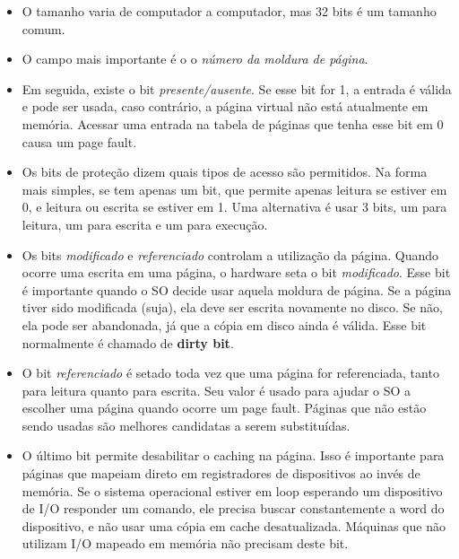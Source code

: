 \documentclass[10pt]{article}
\begin{document}
\begin{itemize}
    \item O tamanho varia de computador a computador, mas 32 bits é um tamanho comum.
    \item O campo mais importante é o o \textit{número da moldura de página}.
    \item Em seguida, existe o bit \textit{presente/ausente}. Se esse bit for
        1, a entrada é válida e pode ser usada, caso contrário, a página virtual
        não está atualmente em memória. Acessar uma entrada na tabela de páginas
        que tenha esse bit em 0 causa um page fault.
    \item Os bits de proteção dizem quais tipos de acesso são permitidos. Na forma
        mais simples, se tem apenas um bit, que permite apenas leitura se estiver em
        0, e leitura ou escrita se estiver em 1. Uma alternativa é usar 3 bits,
        um para leitura, um para escrita e um para execução.
    \item Os bits \textit{modificado} e \textit{referenciado} controlam a utilização
        da página. Quando ocorre uma escrita em uma página, o hardware seta o bit
        \textit{modificado}. Esse bit é importante quando o SO decide usar aquela
        moldura de página. Se a página tiver sido modificada (suja), ela deve ser
        escrita novamente no disco. Se não, ela pode ser abandonada, já que a cópia
        em disco ainda é válida. Esse bit normalmente é chamado de \textbf{dirty bit}.
    \item O bit \textit{referenciado} é setado toda vez que uma página for referenciada,
        tanto para leitura quanto para escrita. Seu valor é usado para ajudar o SO a 
        escolher uma página quando ocorre um page fault. Páginas que não estão sendo
        usadas são melhores candidatas a serem substituídas.
    \item O último bit permite desabilitar o caching na página. Isso é importante para
        páginas que mapeiam direto em registradores de dispositivos ao invés de memória. 
        Se o sistema operacional estiver em loop esperando um dispositivo de I/O responder
        um comando, ele precisa buscar constantemente a word do dispositivo, e não usar
        uma cópia em cache desatualizada. Máquinas que não utilizam I/O mapeado em 
        memória não precisam deste bit.
\end{itemize}
\end{document}
